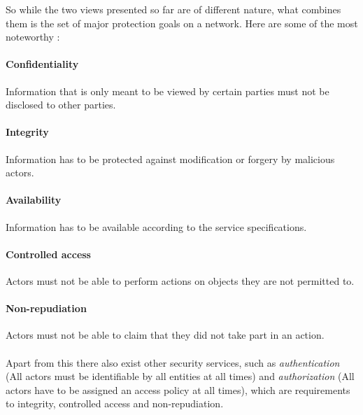 So while the two views presented so far are of different nature, what combines them is the set of major protection goals on a network. Here are some of the most noteworthy \cite{goals}:

\paragraph{Confidentiality} Information that is only meant to be viewed by certain parties must not be disclosed to other parties.

\paragraph{Integrity} Information has to be protected against modification or forgery by malicious actors.

\paragraph{Availability} Information has to be available according to the service specifications.

\paragraph{Controlled access} Actors must not be able to perform actions on objects they are not permitted to.

\paragraph{Non-repudiation} Actors must not be able to claim that they did not take part in an action.


\paragraph{} Apart from this there also exist other security services, such as \textit{authentication} (All actors must be identifiable by all entities at all times) and \textit{authorization} (All actors have to be assigned an access policy at all times), which are requirements to integrity, controlled access and non-repudiation.

